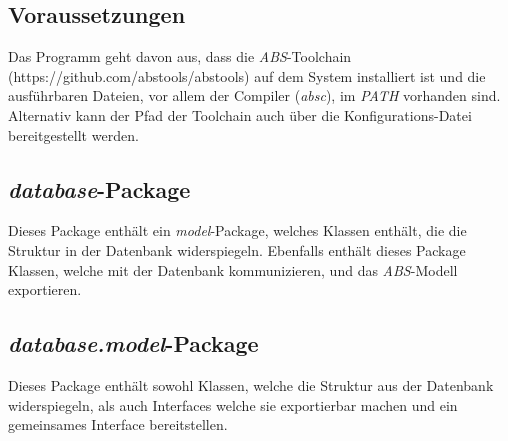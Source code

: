 \documentclass[accentcolor=tud0b,12pt,paper=a4]{tudreport}
\begin{document}
		\subsection{Voraussetzungen}
			Das Programm geht davon aus, dass die \textit{ABS}-Toolchain (https://github.com/abstools/abstools) auf dem System installiert ist und die ausführbaren Dateien, vor allem der Compiler (\textit{absc}), im \textit{PATH} vorhanden sind. Alternativ kann der Pfad der Toolchain auch über die Konfigurations-Datei bereitgestellt werden.
		
		\subsection{\textit{database}-Package}
		\label{dbpackage}
			Dieses Package enthält ein \textit{model}-Package, welches Klassen enthält, die die Struktur in der Datenbank widerspiegeln. Ebenfalls enthält dieses Package Klassen, welche mit der Datenbank kommunizieren, und das \textit{ABS}-Modell exportieren.
		
		\subsection{\textit{database.model}-Package}
			Dieses Package enthält sowohl Klassen, welche die Struktur aus der Datenbank widerspiegeln, als auch Interfaces welche sie exportierbar machen und ein gemeinsames Interface bereitstellen.
	
\end{document}
